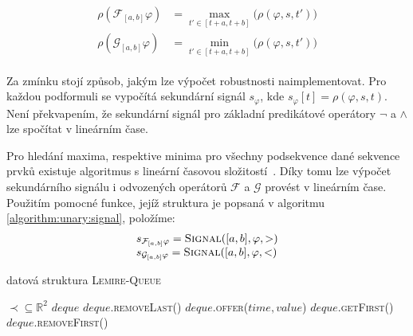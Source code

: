 
\begin{align}\label{eq:stl:semantics}
\begin{array}{ll}
\rho(\mathcal{F}_{[a, b]}\varphi)		&= {\displaystyle \max_{t' \in [t + a, t + b]}} \Big(\rho(\varphi, s, t')\Big)		\\
\rho(\mathcal{G}_{[a, b]}\varphi)		&= {\displaystyle \min_{t' \in [t + a, t + b]}} \Big(\rho(\varphi, s, t')\Big)		
\end{array}
\end{align}

Za zmínku stojí způsob, jakým lze výpočet robustnosti naimplementovat. Pro každou podformuli
se vypočítá sekundární signál $s_\varphi$, kde $s_\varphi[t] = \rho(\varphi, s, t)$.
Není překvapením, že sekundární signál pro základní predikátové operátory
$\neg$ a $\wedge$ lze spočítat v lineárním čase.

Pro hledání maxima, respektive minima pro všechny podsekvence dané sekvence
prvků existuje algoritmus s lineární časovou složitostí~\cite{lemire2006}. Díky tomu lze
výpočet sekundárního signálu i odvozených operátorů $\mathcal{F}$ a $\mathcal{G}$ pro\-vést
v lineárním čase. Použitím pomocné funkce, jejíž struktura je popsaná v algoritmu \ref{algorithm:unary:signal},
položíme:
\begin{align}\label{eq:stl:semantics}
\begin{array}{ll}
s_{\mathcal{F}_{[a,b]}\varphi} = \textsc{Signal}([a,b], \varphi, >)				\\
s_{\mathcal{G}_{[a,b]}\varphi} = \textsc{Signal}([a,b], \varphi, <)
\end{array}
\end{align}


\begin{algorithm}
\caption{datová struktura \textsc{Lemire-Queue}}
\begin{algorithmic}
\Require 	$\prec \subseteq \mathbb{R}^2$ 
\State $deque$ 
		\State $deque$.\textsc{removeLast()}
	\EndWhile
	\State $deque$.\textsc{offer(}$time, value$\textsc{)}
\EndFunction
{}
	\State\Return $deque$.\textsc{getFirst()}
\EndFunction
{}
	\State\Return $deque$.\textsc{removeFirst()}
\EndFunction
\end{algorithmic}
\end{algorithm}

